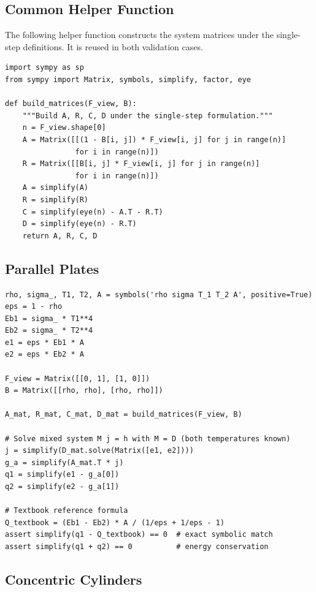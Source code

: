 \documentclass[preprint,1p,times]{elsarticle}
\theoremstyle{plain}
\theoremstyle{definition}
\theoremstyle{remark}
\begin{document}
\subsection{Common Helper Function}
\label{app:helpers}

The following helper function constructs the system matrices under the single-step definitions. It is reused in both validation cases.

\begin{verbatim}
import sympy as sp
from sympy import Matrix, symbols, simplify, factor, eye

def build_matrices(F_view, B):
    """Build A, R, C, D under the single-step formulation."""
    n = F_view.shape[0]
    A = Matrix([[(1 - B[i, j]) * F_view[i, j] for j in range(n)]
                for i in range(n)])
    R = Matrix([[B[i, j] * F_view[i, j] for j in range(n)]
                for i in range(n)])
    A = simplify(A)
    R = simplify(R)
    C = simplify(eye(n) - A.T - R.T)
    D = simplify(eye(n) - R.T)
    return A, R, C, D
\end{verbatim}

\subsection{Parallel Plates}
\label{app:plates_script}

\begin{verbatim}
rho, sigma_, T1, T2, A = symbols('rho sigma T_1 T_2 A', positive=True)
eps = 1 - rho
Eb1 = sigma_ * T1**4
Eb2 = sigma_ * T2**4
e1 = eps * Eb1 * A
e2 = eps * Eb2 * A

F_view = Matrix([[0, 1], [1, 0]])
B = Matrix([[rho, rho], [rho, rho]])

A_mat, R_mat, C_mat, D_mat = build_matrices(F_view, B)

# Solve mixed system M j = h with M = D (both temperatures known)
j = simplify(D_mat.solve(Matrix([e1, e2])))
g_a = simplify(A_mat.T * j)
q1 = simplify(e1 - g_a[0])
q2 = simplify(e2 - g_a[1])

# Textbook reference formula
Q_textbook = (Eb1 - Eb2) * A / (1/eps + 1/eps - 1)
assert simplify(q1 - Q_textbook) == 0  # exact symbolic match
assert simplify(q1 + q2) == 0          # energy conservation
\end{verbatim}

\subsection{Concentric Cylinders}
\label{app:cylinders_script}
\end{document}
